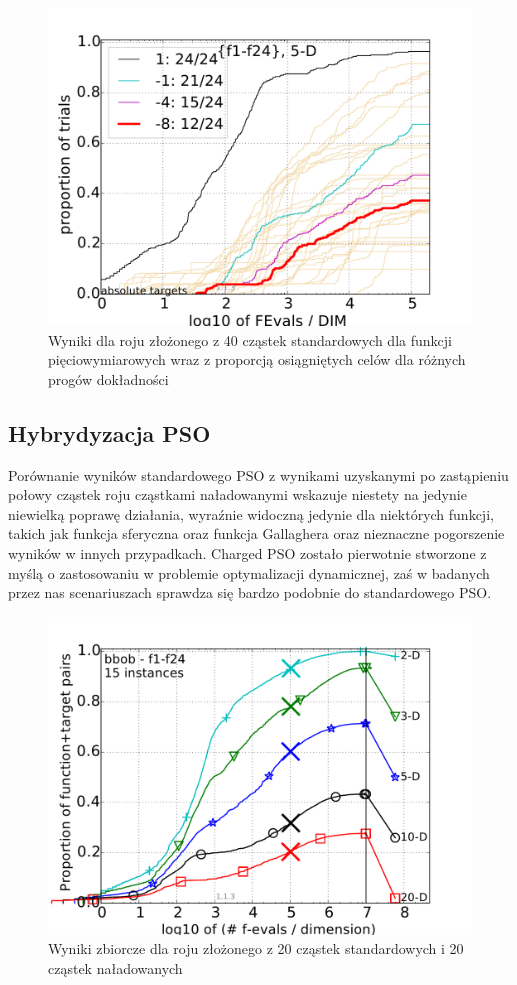 \documentclass[12pt, twoside, openany, abstract=on]{report}
\theoremstyle{definition}
\begin{document}
\begin{figure}[H]
    \centering
    \includegraphics[scale=1]{charts/1node40st_5D.pdf} 
 \caption{Wyniki dla roju złożonego z 40 cząstek standardowych dla funkcji pięciowymiarowych wraz z proporcją osiągniętych celów dla różnych progów dokładności}
\end{figure}

\subsection{Hybrydyzacja PSO}
Porównanie wyników standardowego PSO z wynikami uzyskanymi po zastąpieniu połowy cząstek roju cząstkami naładowanymi wskazuje niestety na jedynie niewielką poprawę działania, wyraźnie widoczną jedynie dla niektórych funkcji, takich jak funkcja sferyczna oraz funkcja Gallaghera oraz nieznaczne pogorszenie wyników w innych przypadkach. Charged PSO zostało pierwotnie stworzone z myślą o zastosowaniu w problemie optymalizacji dynamicznej, zaś w badanych przez nas scenariuszach sprawdza się bardzo podobnie do standardowego PSO.

\begin{figure}[H]
    \centering
    \includegraphics[scale=1]{charts/1node20ch20st.pdf} 
 \caption{Wyniki zbiorcze dla roju złożonego z 20 cząstek standardowych i 20 cząstek naładowanych}
\end{figure}
\end{document}
